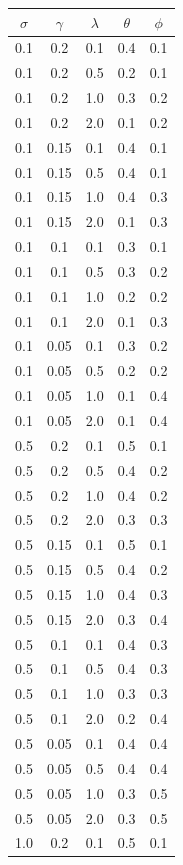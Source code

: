 \documentclass[journal]{IEEEtran}
\begin{document}
\begin{table}[ht]
\centering
\begin{tabular}{c|c|c|c|c}
\hline
$\sigma$ & $\gamma$ & $\lambda$ & $\theta$ & $\phi$\\
\hline
0.1 & 0.2 & 0.1 & 0.4 & 0.1 \\
0.1 & 0.2 & 0.5 & 0.2 & 0.1 \\
0.1 & 0.2 & 1.0 & 0.3 & 0.2 \\
0.1 & 0.2 & 2.0 & 0.1 & 0.2 \\
0.1 & 0.15 & 0.1 & 0.4 & 0.1 \\
0.1 & 0.15 & 0.5 & 0.4 & 0.1 \\
0.1 & 0.15 & 1.0 & 0.4 & 0.3 \\
0.1 & 0.15 & 2.0 & 0.1 & 0.3 \\
0.1 & 0.1 & 0.1 & 0.3 & 0.1 \\
0.1 & 0.1 & 0.5 & 0.3 & 0.2 \\
0.1 & 0.1 & 1.0 & 0.2 & 0.2 \\
0.1 & 0.1 & 2.0 & 0.1 & 0.3 \\
0.1 & 0.05 & 0.1 & 0.3 & 0.2 \\
0.1 & 0.05 & 0.5 & 0.2 & 0.2 \\
0.1 & 0.05 & 1.0 & 0.1 & 0.4 \\
0.1 & 0.05 & 2.0 & 0.1 & 0.4 \\
0.5 & 0.2 & 0.1 & 0.5 & 0.1 \\
0.5 & 0.2 & 0.5 & 0.4 & 0.2 \\
0.5 & 0.2 & 1.0 & 0.4 & 0.2 \\
0.5 & 0.2 & 2.0 & 0.3 & 0.3 \\
0.5 & 0.15 & 0.1 & 0.5 & 0.1 \\
0.5 & 0.15 & 0.5 & 0.4 & 0.2 \\
0.5 & 0.15 & 1.0 & 0.4 & 0.3 \\
0.5 & 0.15 & 2.0 & 0.3 & 0.4 \\
0.5 & 0.1 & 0.1 & 0.4 & 0.3 \\
0.5 & 0.1 & 0.5 & 0.4 & 0.3 \\
0.5 & 0.1 & 1.0 & 0.3 & 0.3 \\
0.5 & 0.1 & 2.0 & 0.2 & 0.4 \\
0.5 & 0.05 & 0.1 & 0.4 & 0.4 \\
0.5 & 0.05 & 0.5 & 0.4 & 0.4 \\
0.5 & 0.05 & 1.0 & 0.3 & 0.5 \\
0.5 & 0.05 & 2.0 & 0.3 & 0.5 \\
1.0 & 0.2 & 0.1 & 0.5 & 0.1 \\

\end{tabular}
\end{table}
\end{document}

